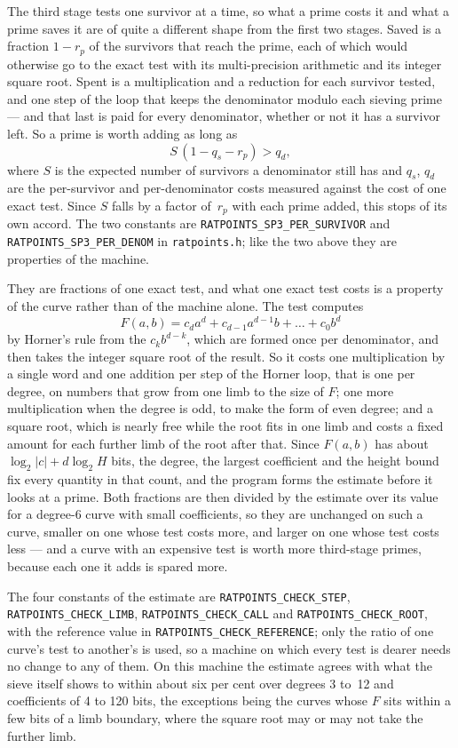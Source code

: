 \documentclass[12pt,a4paper,oneside]{amsart}
\begin{document}
The third stage tests one survivor at a time, so what a prime costs it and
what a prime saves it are of quite a different shape from the first two
stages. Saved is a fraction $1 - r_p$ of the survivors that reach the prime,
each of which would otherwise go to the exact test with its multi-precision
arithmetic and its integer square root. Spent is a multiplication and a
reduction for each survivor tested, and one step of the loop that keeps the
denominator modulo each sieving prime --- and that last is paid for every
denominator, whether or not it has a survivor left. So a prime is worth
adding as long as
\[ S\,(1 - q_s - r_p) > q_d , \]
where $S$ is the expected number of survivors a denominator still has and
$q_s$, $q_d$ are the per-survivor and per-denominator costs measured against
the cost of one exact test. Since $S$ falls by a factor of~$r_p$ with each
prime added, this stops of its own accord. The two constants are
\texttt{RATPOINTS\_SP3\_PER\_SURVIVOR} and
\texttt{RATPOINTS\_SP3\_PER\_DENOM} in \texttt{ratpoints.h}; like the two
above they are properties of the machine.

They are fractions of one exact test, and what one exact test costs is a
property of the curve rather than of the machine alone. The test computes
\[ F(a,b) = c_d a^d + c_{d-1} a^{d-1} b + \dots + c_0 b^d \]
by Horner's rule from the $c_k b^{d-k}$, which are formed once per
denominator, and then takes the integer square root of the result. So it
costs one multiplication by a single word and one addition per step of the
Horner loop, that is one per degree, on numbers that grow from one limb to
the size of $F$; one more multiplication when the degree is odd, to make the
form of even degree; and a square root, which is nearly free while the root
fits in one limb and costs a fixed amount for each further limb of the root
after that. Since $F(a,b)$ has about $\log_2|c| + d\log_2 H$ bits, the degree,
the largest coefficient and the height bound fix every quantity in that
count, and the program forms the estimate before it looks at a prime. Both
fractions are then divided by the estimate over its value for a degree-6
curve with small coefficients, so they are unchanged on such a curve, smaller
on one whose test costs more, and larger on one whose test costs less --- and
a curve with an expensive test is worth more third-stage primes, because each
one it adds is spared more.

The four constants of the estimate are \texttt{RATPOINTS\_CHECK\_STEP},
\texttt{RATPOINTS\_CHECK\_LIMB}, \texttt{RATPOINTS\_CHECK\_CALL} and
\texttt{RATPOINTS\_CHECK\_ROOT}, with the reference value in
\texttt{RATPOINTS\_CHECK\_REFERENCE}; only the ratio of one curve's test to
another's is used, so a machine on which every test is dearer needs no change
to any of them. On this machine the estimate agrees with what the sieve
itself shows to within about six per cent over degrees 3 to~12 and
coefficients of 4 to 120 bits, the exceptions being the curves whose $F$ sits
within a few bits of a limb boundary, where the square root may or may not
take the further limb.
\end{document}
